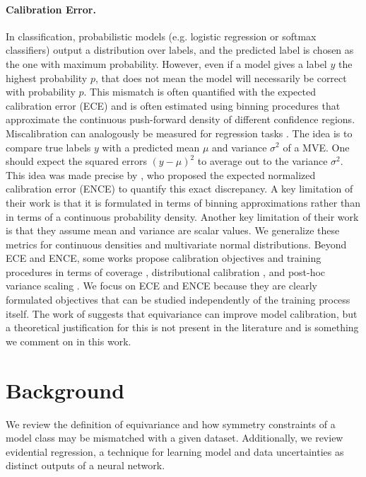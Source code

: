 \documentclass[10pt]{article} %
\theoremstyle{definition}
\begin{document}
\paragraph{Calibration Error.} 
In classification, probabilistic models (e.g. logistic regression or softmax classifiers) output a distribution over labels, and the predicted label is chosen as the one with maximum probability. However, even if a model gives a label $y$ the highest probability $p$, that does not mean the model will necessarily be correct with probability $p$. This mismatch is often quantified with the expected calibration error (ECE) \citep{guo2017calibration} and is often estimated using binning procedures that approximate the continuous push-forward density of different confidence regions. Miscalibration can analogously be measured for regression tasks \citep{pernot2023properties, s22155540}. The idea is to compare true labels $y$ with a predicted mean $\mu$ and variance $\sigma^2$ of a MVE. One should expect the squared errors $(y - \mu)^2$ to average out to the variance $\sigma^2$. This idea was made precise by \cite{levi2022evaluating}, who proposed the expected normalized calibration error (ENCE) to quantify this exact discrepancy. A key limitation of their work is that it is formulated in terms of binning approximations rather than in terms of a continuous probability density. Another key limitation of their work is that they assume mean and variance are scalar values. We generalize these metrics for continuous densities and multivariate normal distributions. Beyond ECE and ENCE, some works propose calibration objectives and training procedures in terms of coverage \citep{gneiting2007strictly, lemos2023sampling, sun2023probabilistic}, distributional calibration \citep{kuleshov2018accurate}, and post-hoc variance scaling \citep{laves2020well}. We focus on ECE and ENCE because they are clearly formulated objectives that can be studied independently of the training process itself. The work of \cite{sun2023probabilistic} suggests that equivariance can improve model calibration, but a theoretical justification for this is not present in the literature and is something we comment on in this work. 

\section{Background}

We review the definition of equivariance and how symmetry constraints of a model class may be mismatched with a given dataset. Additionally, we review evidential regression, a technique for learning model and data uncertainties as distinct outputs of a neural network.  
\end{document}
